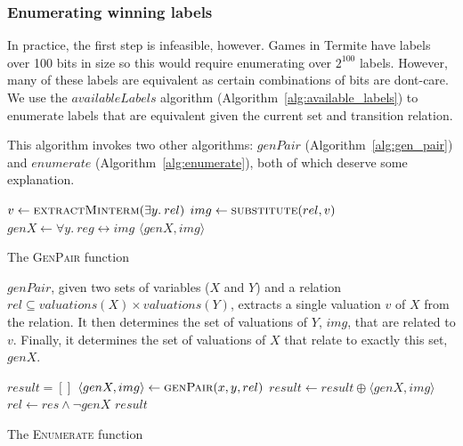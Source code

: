 \subsubsection{Enumerating winning labels}

In practice, the first step is infeasible, however. Games in Termite have labels over 100 bits in size so this would require enumerating over $2^{100}$ labels. However, many of these labels are equivalent as certain combinations of bits are dont-care. We use the $availableLabels$ algorithm (Algorithm~\ref{alg:available_labels}) to enumerate labels that are equivalent given the current set and transition relation.

This algorithm invokes two other algorithms: $genPair$ (Algorithm~\ref{alg:gen_pair}) and $enumerate$ (Algorithm~\ref{alg:enumerate}), both of which deserve some explanation. 

\begin{algorithm}
\begin{algorithmic}

    \State $v \gets \Call{extractMinterm}{\exists y. \: rel}$
    \State $img      \gets \Call{substitute}{rel, v}$
    \State $genX     \gets \forall y. \: reg \leftrightarrow img$
    \State\Return $\langle genX, img \rangle$
\EndFunction

\end{algorithmic}
\caption{The \textsc{GenPair} function}
\label{alg:gen_pair}
\end{algorithm}

$genPair$, given two sets of variables ($X$ and $Y$) and a relation $rel \subseteq valuations(X) \times valuations (Y)$, extracts a single valuation $v$ of $X$ from the relation. It then determines the set of valuations of $Y$, $img$, that are related to $v$. Finally, it determines the set of valuations of $X$ that relate to exactly this set, $genX$. 

\begin{algorithm}
\begin{algorithmic}

    \State $result = []$
        \State $\langle genX, img \rangle \gets \Call{genPair}{x, y, rel}$
        \State $result \gets result \oplus \langle genX, img \rangle$
        \State $rel \gets res \land \neg genX$
    \EndWhile
    \State\Return $result$
\EndFunction

\end{algorithmic}
\caption{The \textsc{Enumerate} function}
\label{alg:enumerate}
\end{algorithm}

